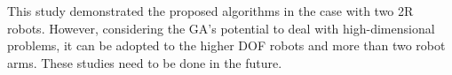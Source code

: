 \documentclass[12pt]{article} %
\begin{document}
This study demonstrated the proposed algorithms in the case with two 2R robots. However, considering the GA's potential to deal with high-dimensional problems, it can be adopted to the higher DOF robots and more than two robot arms. These studies need to be done in the future.	


\newpage
\end{document}
